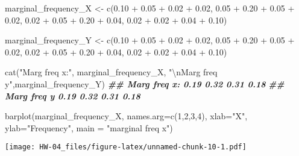 \documentclass[
]{article}
\newenvironment{Shaded}{\begin{snugshade}}{\end{snugshade}}
\newcommand{\AttributeTok}[1]{\textcolor[rgb]{0.77,0.63,0.00}{#1}}
\newcommand{\DecValTok}[1]{\textcolor[rgb]{0.00,0.00,0.81}{#1}}
\newcommand{\DocumentationTok}[1]{\textcolor[rgb]{0.56,0.35,0.01}{\textbf{\textit{#1}}}}
\newcommand{\FloatTok}[1]{\textcolor[rgb]{0.00,0.00,0.81}{#1}}
\newcommand{\FunctionTok}[1]{\textcolor[rgb]{0.00,0.00,0.00}{#1}}
\newcommand{\NormalTok}[1]{#1}
\newcommand{\OtherTok}[1]{\textcolor[rgb]{0.56,0.35,0.01}{#1}}
\newcommand{\SpecialCharTok}[1]{\textcolor[rgb]{0.00,0.00,0.00}{#1}}
\newcommand{\StringTok}[1]{\textcolor[rgb]{0.31,0.60,0.02}{#1}}
\begin{document}
\begin{Shaded}
\begin{Highlighting}[]


\NormalTok{marginal\_frequency\_X }\OtherTok{\textless{}{-}} \FunctionTok{c}\NormalTok{(}\FloatTok{0.10} \SpecialCharTok{+} \FloatTok{0.05} \SpecialCharTok{+} \FloatTok{0.02} \SpecialCharTok{+} \FloatTok{0.02}\NormalTok{,}
                          \FloatTok{0.05} \SpecialCharTok{+} \FloatTok{0.20} \SpecialCharTok{+} \FloatTok{0.05} \SpecialCharTok{+} \FloatTok{0.02}\NormalTok{,}
                          \FloatTok{0.02} \SpecialCharTok{+} \FloatTok{0.05} \SpecialCharTok{+} \FloatTok{0.20} \SpecialCharTok{+} \FloatTok{0.04}\NormalTok{,}
                          \FloatTok{0.02} \SpecialCharTok{+} \FloatTok{0.02} \SpecialCharTok{+} \FloatTok{0.04} \SpecialCharTok{+} \FloatTok{0.10}\NormalTok{)}

\NormalTok{marginal\_frequency\_Y }\OtherTok{\textless{}{-}} \FunctionTok{c}\NormalTok{(}\FloatTok{0.10} \SpecialCharTok{+} \FloatTok{0.05} \SpecialCharTok{+} \FloatTok{0.02} \SpecialCharTok{+} \FloatTok{0.02}\NormalTok{,}
                          \FloatTok{0.05} \SpecialCharTok{+} \FloatTok{0.20} \SpecialCharTok{+} \FloatTok{0.05} \SpecialCharTok{+} \FloatTok{0.02}\NormalTok{,}
                          \FloatTok{0.02} \SpecialCharTok{+} \FloatTok{0.05} \SpecialCharTok{+} \FloatTok{0.20} \SpecialCharTok{+} \FloatTok{0.04}\NormalTok{,}
                          \FloatTok{0.02} \SpecialCharTok{+} \FloatTok{0.02} \SpecialCharTok{+} \FloatTok{0.04} \SpecialCharTok{+} \FloatTok{0.10}\NormalTok{)}

\FunctionTok{cat}\NormalTok{(}\StringTok{"Marg freq x:"}\NormalTok{, marginal\_frequency\_X, }\StringTok{"}\SpecialCharTok{\textbackslash{}n}\StringTok{Marg freq y"}\NormalTok{,marginal\_frequency\_Y)}
\DocumentationTok{\#\# Marg freq x: 0.19 0.32 0.31 0.18 }
\DocumentationTok{\#\# Marg freq y 0.19 0.32 0.31 0.18}

\FunctionTok{barplot}\NormalTok{(marginal\_frequency\_X, }\AttributeTok{names.arg=}\FunctionTok{c}\NormalTok{(}\DecValTok{1}\NormalTok{,}\DecValTok{2}\NormalTok{,}\DecValTok{3}\NormalTok{,}\DecValTok{4}\NormalTok{), }\AttributeTok{xlab=}\StringTok{"X"}\NormalTok{, }\AttributeTok{ylab=}\StringTok{"Frequency"}\NormalTok{, }\AttributeTok{main =} \StringTok{"marginal freq x"}\NormalTok{)}
\end{Highlighting}
\end{Shaded}

\texttt{[image: HW-04\_files/figure-latex/unnamed-chunk-10-1.pdf]}
\end{document}

